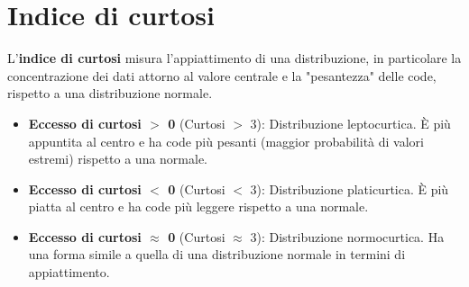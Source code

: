 \documentclass[14pt, openany, titlepage]{report} %
\begin{document}
\section{Indice di curtosi} 
L'\textbf{indice di curtosi} misura l'appiattimento di
 una distribuzione, in particolare la concentrazione dei dati attorno
  al valore centrale e la "pesantezza" delle code, rispetto a una 
  distribuzione normale.
\begin{itemize}
    \item \textbf{Eccesso di curtosi $>$ 0} (Curtosi $>$ 3): Distribuzione leptocurtica. È più appuntita al centro e ha code più pesanti (maggior probabilità di valori estremi) rispetto a una normale.
    \item \textbf{Eccesso di curtosi $<$ 0} (Curtosi $<$ 3): Distribuzione platicurtica. È più piatta al centro e ha code più leggere rispetto a una normale.
    \item \textbf{Eccesso di curtosi $\approx$ 0} (Curtosi $\approx$ 3): Distribuzione normocurtica. Ha una forma simile a quella di una distribuzione normale in termini di appiattimento.
\end{itemize}
\end{document}
